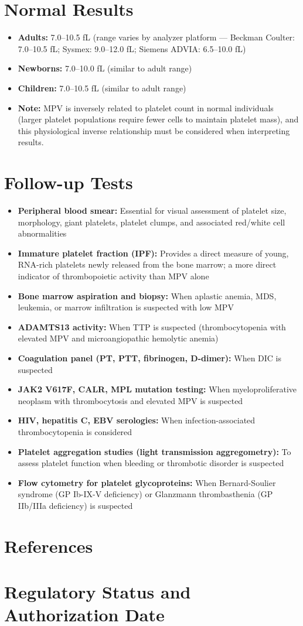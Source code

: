 \section*{Normal Results}
\begin{itemize}
  \item \textbf{Adults:} 7.0--10.5 fL (range varies by analyzer platform --- Beckman Coulter: 7.0--10.5 fL; Sysmex: 9.0--12.0 fL; Siemens ADVIA: 6.5--10.0 fL)
  \item \textbf{Newborns:} 7.0--10.0 fL (similar to adult range)
  \item \textbf{Children:} 7.0--10.5 fL (similar to adult range)
  \item \textbf{Note:} MPV is inversely related to platelet count in normal individuals (larger platelet populations require fewer cells to maintain platelet mass), and this physiological inverse relationship must be considered when interpreting results.
\end{itemize}

\section*{Follow-up Tests}
\begin{itemize}
  \item \textbf{Peripheral blood smear:} Essential for visual assessment of platelet size, morphology, giant platelets, platelet clumps, and associated red/white cell abnormalities
  \item \textbf{Immature platelet fraction (IPF):} Provides a direct measure of young, RNA-rich platelets newly released from the bone marrow; a more direct indicator of thrombopoietic activity than MPV alone
  \item \textbf{Bone marrow aspiration and biopsy:} When aplastic anemia, MDS, leukemia, or marrow infiltration is suspected with low MPV
  \item \textbf{ADAMTS13 activity:} When TTP is suspected (thrombocytopenia with elevated MPV and microangiopathic hemolytic anemia)
  \item \textbf{Coagulation panel (PT, PTT, fibrinogen, D-dimer):} When DIC is suspected
  \item \textbf{JAK2 V617F, CALR, MPL mutation testing:} When myeloproliferative neoplasm with thrombocytosis and elevated MPV is suspected
  \item \textbf{HIV, hepatitis C, EBV serologies:} When infection-associated thrombocytopenia is considered
  \item \textbf{Platelet aggregation studies (light transmission aggregometry):} To assess platelet function when bleeding or thrombotic disorder is suspected
  \item \textbf{Flow cytometry for platelet glycoproteins:} When Bernard-Soulier syndrome (GP Ib-IX-V deficiency) or Glanzmann thrombasthenia (GP IIb/IIIa deficiency) is suspected
\end{itemize}

\section*{References}



\clearpage
\section*{Regulatory Status and Authorization Date}

\clearpage
